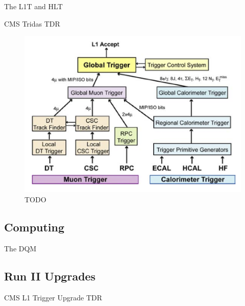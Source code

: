 The \gls{L1T} and \gls{HLT}

CMS Tridas TDR\cite{CMSTDR:CMSTridasTDR} 

\begin{figure}[!htb]
  \centering
  \includegraphics{Chapter02/CMS/Images/CMS_L1T_Layout.png}
  \caption{TODO}
  \label{FIGURE:ExperimentalApparatus_CMS_L1T_Layout}
\end{figure}

\subsection{Computing}
\label{SUBSECTION:ExperimentalApparatus_CMS_Computing}

The \gls{DQM} 

\subsection{Run II Upgrades}
\label{SUBSECTION:ExperimentalApparatus_CMS_RUNII}

CMS L1 Trigger Upgrade TDR\cite{CMSTDR:CMSL1Upgrade}
